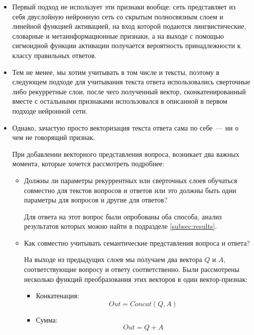 \documentclass[../diploma.tex]{subfiles}
\begin{document}
	\begin{itemize}
		\item
		Первый подход не использует эти признаки вообще: сеть представляет из себя двуслойную нейронную сеть со скрытым полносвязным слоем и линейной функцией активацией, 
		на вход которой подаются лингвистические, словарные и метаинформационные признаки, 
		а на выходе с помощью сигмоидной функции активации получается вероятность принадлежности к классу правильных ответов.
		
		\item
		Тем не менее, мы хотим учитывать в том числе и тексты, поэтому в следующем подходе для учитывания текста ответа использовались сверточные либо рекурретные слои, 
		после чего полученный вектор, сконкатенированный вместе с остальными признаками использовался в описанной в первом подходе нейронной сети.

		\item
		Однако, зачастую просто векторизация текста ответа сама по себе~--- ни о чем не говорящий признак.
		
		При добавлении векторного представления вопроса, возникает два важных момента, которые хочется рассмотреть подробнее: 
		\begin{itemize}
			\item
			Должны ли параметры рекуррентных или сверточных слоев обучаться совместно для текстов вопросов и ответов 
			или это должны быть одни параметры для вопросов и другие для ответов?
			                                                                                                                   
			Для ответа на этот вопрос были опробованы оба способа, анализ результатов которых можно найти в подразделе \ref{subsec:results}.

			\item
			Как совместно учитывать семантические представления вопроса и ответа?

			На выходе из предыдущих слоев мы получаем два вектора $Q$ и $A$, соответствующие вопросу и ответу соответственно.
			Были рассмотрены несколько функций преобразования этих векторов в один вектор-признак:

			\begin{itemize}
				\item
				Конкатенация: 
				\begin{equation}
					Out = Concat(Q, A)
   				\end{equation}

				\item
				Сумма: 
				\begin{equation}
					Out = Q + A
   				\end{equation}


\end{itemize}
\end{itemize}
\end{itemize}
\end{document}

